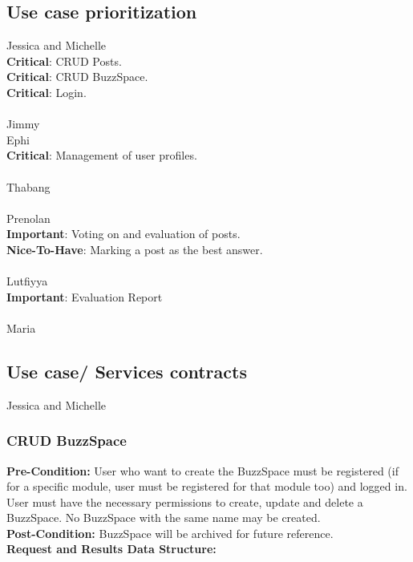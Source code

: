 \documentclass[a4paper,11pt]{article}
\begin{document}
\subsection{Use case prioritization}
Jessica and Michelle\\
\textbf{Critical}: CRUD Posts.\\
\textbf{Critical}: CRUD BuzzSpace.\\
\textbf{Critical}: Login.
\\
\\
Jimmy\\
Ephi\\
\textbf{Critical}: Management of user profiles.
\\
\\
Thabang\\
\\
Prenolan\\
\textbf{Important}: Voting on and evaluation of posts.
\\
\textbf{Nice-To-Have}: Marking a post as the best answer.
\\
\\
Lutfiyya\\
\textbf{Important}: Evaluation Report
\\
\\
Maria\\


\subsection{Use case/ Services contracts}
Jessica and Michelle\\
\subsubsection{CRUD BuzzSpace}
\textbf{Pre-Condition:} User who want to create the BuzzSpace must be registered (if for a specific module, user must be registered for that module too) and logged in.
User must have the necessary permissions to create, update and delete a BuzzSpace.
No BuzzSpace with the same name may be created.
\\
\textbf{Post-Condition:} BuzzSpace will be archived for future reference.
\\
\textbf{Request and Results Data Structure:}
\\
\\
\end{document}
